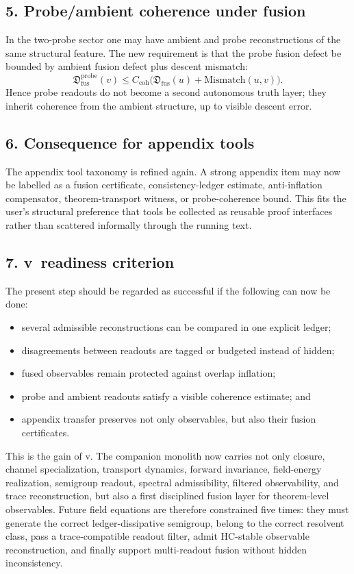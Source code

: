 \subsection*{5. Probe/ambient coherence under fusion}
In the two-probe sector one may have ambient and probe reconstructions of the same
structural feature. The new requirement is that the probe fusion defect be bounded
by ambient fusion defect plus descent mismatch:
\[
\mathfrak D^{\mathrm{probe}}_{\mathrm{fus}}(v)
\le C_{\mathrm{coh}}
\bigl(
\mathfrak D_{\mathrm{fus}}(u)+\mathrm{Mismatch}(u,v)
\bigr).
\]
Hence probe readouts do not become a second autonomous truth layer; they inherit
coherence from the ambient structure, up to visible descent error.

\subsection*{6. Consequence for appendix tools}
The appendix tool taxonomy is refined again. A strong appendix item may now be
labelled as a fusion certificate, consistency-ledger estimate, anti-inflation
compensator, theorem-transport witness, or probe-coherence bound. This fits the
user's structural preference that tools be collected as reusable proof interfaces
rather than scattered informally through the running text.

\subsection*{7. v\docversion\ readiness criterion}
The present step should be regarded as successful if the following can now be
done:
\begin{itemize}
  \item several admissible reconstructions can be compared in one explicit ledger;
  \item disagreements between readouts are tagged or budgeted instead of hidden;
  \item fused observables remain protected against overlap inflation;
  \item probe and ambient readouts satisfy a visible coherence estimate; and
  \item appendix transfer preserves not only observables, but also their fusion certificates.
\end{itemize}

This is the gain of v\docversion. The companion monolith now carries not only
closure, channel specialization, transport dynamics, forward invariance,
field-energy realization, semigroup readout, spectral admissibility, filtered
observability, and trace reconstruction, but also a first disciplined fusion
layer for theorem-level observables. Future field equations are therefore
constrained five times: they must generate the correct ledger-dissipative
semigroup, belong to the correct resolvent class, pass a trace-compatible readout
filter, admit HC-stable observable reconstruction, and finally support
multi-readout fusion without hidden inconsistency.



